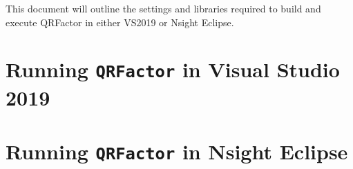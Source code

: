 \documentclass[11pt,letterpaper]{article}
\begin{document}
This document will outline the settings and libraries required to build and execute QRFactor in either VS2019 or Nsight Eclipse. 

\section*{Running \texttt{QRFactor} in Visual Studio 2019}




\section*{Running \texttt{QRFactor} in Nsight Eclipse}
\end{document}
